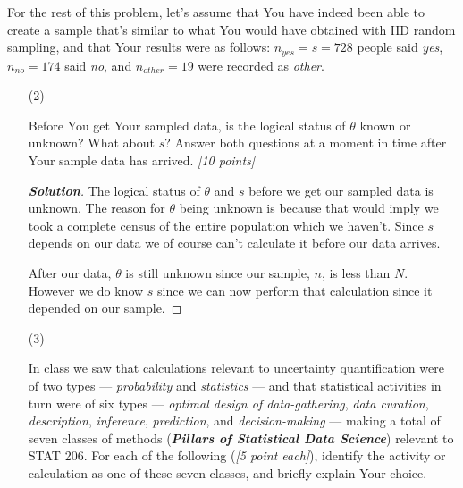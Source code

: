 \documentclass[12pt]{article}
\newenvironment{solution}{\begin{proof}[\textbf{\textit{Solution}}] }{\end{proof}}
\begin{document}
For the rest of this problem, let's assume that You have indeed been able to create a sample that's similar to what You would have obtained with IID random sampling, and that Your results were as follows: $n_{ yes } = s = 728$ people said \textit{yes}, $n_{ no } = 174$ said \textit{no}, and $n_{ other } = 19$ were recorded as \textit{other}.

\begin{itemize}
\item[(2)]

Before You get Your sampled data, is the logical status of $\theta$ known or unknown? What about $s$? Answer both questions at a moment in time after Your sample data has arrived. \textit{[10 points]}
\begin{tcolorbox}
    \begin{solution}
        The logical status of $\theta$ and $s$ before we get our sampled data is unknown. The reason for $\theta$ being unknown is because that would imply we took a complete census of the entire population which we haven't. Since $s$ depends on our data we of course can't calculate it before our data arrives. 

        After our data, $\theta$ is still unknown since our sample, $n$, is less than $N$. However we do know $s$ since we can now perform that calculation since it depended on our sample.  
    \end{solution}
\end{tcolorbox}

\vspace*{0.5in}
\item[(3)]

In class we saw that calculations relevant to uncertainty quantification were of two types --- \textit{probability} and \textit{statistics} --- and that statistical activities in turn were of six types --- \textit{optimal design of data-gathering}, \textit{data curation}, \textit{description}, \textit{inference}, \textit{prediction}, and \textit{decision-making} --- making a total of seven classes of methods (\textit{\textbf{Pillars of Statistical Data Science}}) relevant to STAT 206. For each of the following (\textit{[5 point each]}), identify the activity or calculation as one of these seven classes, and briefly explain Your choice.

\begin{itemize}


\end{itemize}
\end{itemize}
\end{document}
